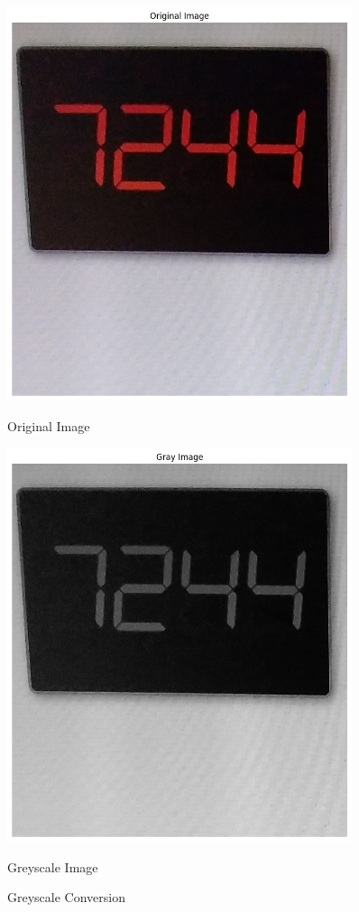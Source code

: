 \begin{figure}[h]
    \centering
    \begin{minipage}{0.45\textwidth}
        \centering
        \includegraphics[width=0.9\textwidth]{Figures/gray/original.png}
        \caption*{Original Image}
    \end{minipage}\hfill
    \begin{minipage}{0.45\textwidth}
        \centering
        \includegraphics[width=0.9\textwidth]{Figures/gray/grey.png}
        \caption*{Greyscale Image}
    \end{minipage}
    \caption{Greyscale Conversion}
\end{figure}


